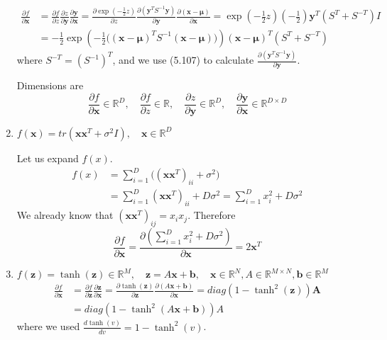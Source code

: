 \begin{enumerate}[label=\alph*.]
\begin{align*}
\frac{\partial f}{\partial \textbf{x}} &= \frac{\partial f}{\partial z} \frac{\partial z}{\partial \textbf{y}}\frac{\partial \textbf{y}}{\partial \textbf{x}} = \frac{\partial \exp(-\frac{1}{2}z)}{\partial z} \frac{\partial (\textbf{y}^TS^{-1}\textbf{y})}{\partial \textbf{y}}\frac{\partial (\textbf{x} - \bm{\mu})}{\partial \textbf{x}} = \exp\left(-\frac{1}{2}z\right)\left(-\frac{1}{2}\right)\textbf{y}^T(S^T + S^{-T})I \\
&=-\frac{1}{2}\exp\left(-\frac{1}{2}\Big((\textbf{x} - \bm{\mu})^TS^{-1}(\textbf{x} - \bm{\mu})\Big)\right)(\textbf{x} - \bm{\mu})^T(S^T + S^{-T})
\end{align*}
where $S^{-T} = \left(S^{-1}\right)^T$, and we use (5.107) to calculate $\frac{\partial (\textbf{y}^TS^{-1}\textbf{y})}{\partial \textbf{y}}$.

Dimensions are 
\[
\frac{\partial f}{\partial \textbf{x}} \in \mathbb{R}^D, \quad \frac{\partial f}{\partial z}\in\mathbb{R}, \quad \frac{\partial z}{\partial \textbf{y}}\in\mathbb{R}^{D}, \quad \frac{\partial \textbf{y}}{\partial \textbf{x}}\in\mathbb{R}^{D\times D}
\]
    
    \item $f(\textbf{x}) = tr(\textbf{x}\textbf{x}^T + \sigma^2I),\quad\textbf{x}\in\mathbb{R}^D$
    
Let us expand $f(x)$.
\begin{align*}
f(x)&= \sum_{i=1}^D \Big( (\textbf{x}\textbf{x}^T)_{ii} + \sigma^2 \Big)\\
    &= \sum_{i=1}^D (\textbf{x}\textbf{x}^T)_{ii} + D\sigma^2 = \sum_{i=1}^D x_i^2 + D\sigma^2
\end{align*} 
We already know that $(\textbf{x}\textbf{x}^T)_{ij} = x_ix_j$. Therefore
\[
\frac{\partial f}{\partial \textbf{x}} = \frac{\partial \left( \sum_{i=1}^D x_i^2 + D\sigma^2 \right)}{\partial \textbf{x}} = 2\textbf{x}^T
\]

    \item $f(\textbf{z}) = \tanh(\textbf{z})\in\mathbb{R}^M,\quad \textbf{z}= A\textbf{x} + \textbf{b}, \quad \textbf{x}\in\mathbb{R}^N, A\in\mathbb{R}^{M\times N}, \textbf{b}\in\mathbb{R}^M$
\begin{align*}
\frac{\partial f}{\partial \textbf{x}} &= \frac{\partial f}{\partial \textbf{z}} \frac{\partial \textbf{z}}{\partial \textbf{x}}= \frac{\partial \tanh(\textbf{z})}{\partial \textbf{z}} \frac{\partial (A\textbf{x} + \textbf{b})}{\partial \textbf{x}} = diag\left(1 - \tanh^2(\textbf{z})\right) \textbf{A}\\
&= diag\left(1 - \tanh^2(A\textbf{x} + \textbf{b})\right) A 
\end{align*}
where we used $\frac{d \tanh(v)}{dv} = 1 - \tanh^2(v)$.


\end{enumerate}
